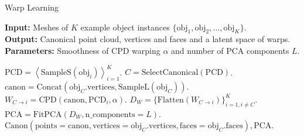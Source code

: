 \documentclass{article}
\begin{document}
\begin{algorithm}[H]

\caption{Warp Learning}\label{alg:warp_learn} 

\begin{flushleft}
    \hspace*{\algorithmicindent} \textbf{Input:} Meshes of $K$ example object instances $\{ \mathrm{obj}_1, \mathrm{obj}_2, ..., \mathrm{obj}_K \}$. \\
    \hspace*{\algorithmicindent} \textbf{Output:} Canonical point cloud, vertices and faces and a latent space of warps. \\
    \hspace*{\algorithmicindent} \textbf{Parameters:} Smoothness of CPD warping $\alpha$ and number of PCA components $L$.
\end{flushleft}

\begin{algorithmic}[1]

    \State $\mathrm{PCD} = \left< \mathrm{SampleS}(\mathrm{obj}_i) \right>_{i=1}^K$. 
    \State $C = \mathrm{SelectCanonical}(\mathrm{PCD})$. 
    \State $\mathrm{canon} = \mathrm{Concat}(\mathrm{obj}_C.\mathrm{vertices}, \mathrm{SampleL}(\mathrm{obj}_C))$. \Comment{\textcolor{blue}{Use both vertices and surface samples.}}
        \State $W_{C \rightarrow i} = \mathrm{CPD}(\mathrm{canon}, \mathrm{PCD}_i, \alpha)$. 
    \EndFor
    \State $D_W = \{ \mathrm{Flatten}(W_{C \rightarrow i}) \}_{i = 1, i \neq C}^K$. 
    \State $\mathrm{PCA} = \mathrm{FitPCA}(D_W, \mathrm{n\_components}=L)$. \Comment{\textcolor{blue}{Learn a latent space of canonical object warps.}}
    \State \Return $\mathrm{Canon}\left(\mathrm{points} = \mathrm{canon}, \mathrm{vertices} = \mathrm{obj}_C.\mathrm{vertices}, \mathrm{faces} = \mathrm{obj}_C.\mathrm{faces}\right), \mathrm{PCA}$.

\end{algorithmic}

\end{algorithm}
\end{document}
